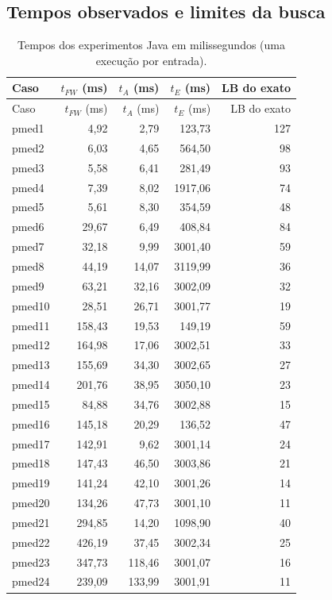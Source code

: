 \documentclass[12pt,a4paper]{article}
\begin{document}
\subsection{Tempos observados e limites da busca}
\begin{longtable}{@{}lrrrr@{}}
\caption{Tempos dos experimentos Java em milissegundos (uma execução por entrada).}\\
\toprule Caso & $t_{FW}$ (ms) & $t_A$ (ms) & $t_E$ (ms) & LB do exato\\ \midrule
\endfirsthead
\toprule Caso & $t_{FW}$ (ms) & $t_A$ (ms) & $t_E$ (ms) & LB do exato\\ \midrule
\endhead
pmed1 & 4,92 & 2,79 & 123,73 & 127 \\
pmed2 & 6,03 & 4,65 & 564,50 & 98 \\
pmed3 & 5,58 & 6,41 & 281,49 & 93 \\
pmed4 & 7,39 & 8,02 & 1917,06 & 74 \\
pmed5 & 5,61 & 8,30 & 354,59 & 48 \\
pmed6 & 29,67 & 6,49 & 408,84 & 84 \\
pmed7 & 32,18 & 9,99 & 3001,40 & 59 \\
pmed8 & 44,19 & 14,07 & 3119,99 & 36 \\
pmed9 & 63,21 & 32,16 & 3002,09 & 32 \\
pmed10 & 28,51 & 26,71 & 3001,77 & 19 \\
pmed11 & 158,43 & 19,53 & 149,19 & 59 \\
pmed12 & 164,98 & 17,06 & 3002,51 & 33 \\
pmed13 & 155,69 & 34,30 & 3002,65 & 27 \\
pmed14 & 201,76 & 38,95 & 3050,10 & 23 \\
pmed15 & 84,88 & 34,76 & 3002,88 & 15 \\
pmed16 & 145,18 & 20,29 & 136,52 & 47 \\
pmed17 & 142,91 & 9,62 & 3001,14 & 24 \\
pmed18 & 147,43 & 46,50 & 3003,86 & 21 \\
pmed19 & 141,24 & 42,10 & 3001,26 & 14 \\
pmed20 & 134,26 & 47,73 & 3001,10 & 11 \\
pmed21 & 294,85 & 14,20 & 1098,90 & 40 \\
pmed22 & 426,19 & 37,45 & 3002,34 & 25 \\
pmed23 & 347,73 & 118,46 & 3001,07 & 16 \\
pmed24 & 239,09 & 133,99 & 3001,91 & 11 \\

\end{longtable}
\end{document}
